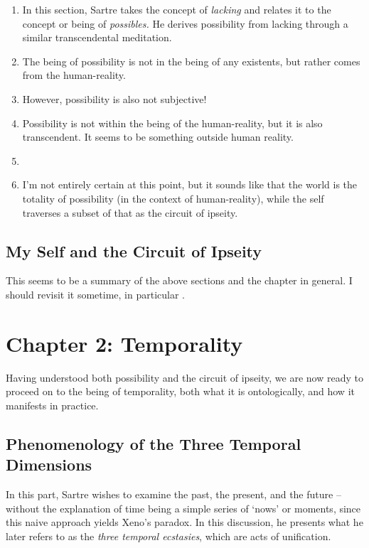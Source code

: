 \begin{enumerate}
  \item In this section, Sartre takes the concept of \emph{lacking} and relates it to the concept or being of \emph{possibles.} He derives possibility from lacking through a similar transcendental meditation.
  \item The being of possibility is not in the being of any existents, but rather comes from the human-reality.
  \item However, possibility is also not subjective!
  \item Possibility is not within the being of the human-reality, but it is also transcendent. It seems to be something outside human reality. \autocite[158]{sartre}
  \item {}
  \item I'm not entirely certain at this point, but it sounds like that the world is the totality of possibility (in the context of human-reality), while the self traverses a subset of that as the circuit of ipseity.
\end{enumerate}

\subsection{My Self and the Circuit of Ipseity}

This seems to be a summary of the above sections and the chapter in general. I should revisit it sometime, in particular \autocite[161]{sartre}.

\section{Chapter 2: Temporality}

Having understood both possibility and the circuit of ipseity, we are now ready to proceed on to the being of temporality, both what it is ontologically, and how it manifests in practice.

\subsection{Phenomenology of the Three Temporal Dimensions}

In this part, Sartre wishes to examine the past, the present, and the future -- without the explanation of time being a simple series of `nows' or moments, since this naive approach yields Xeno's paradox. In this discussion, he presents what he later refers to as the \emph{three temporal ecstasies}, which are acts of unification. 

